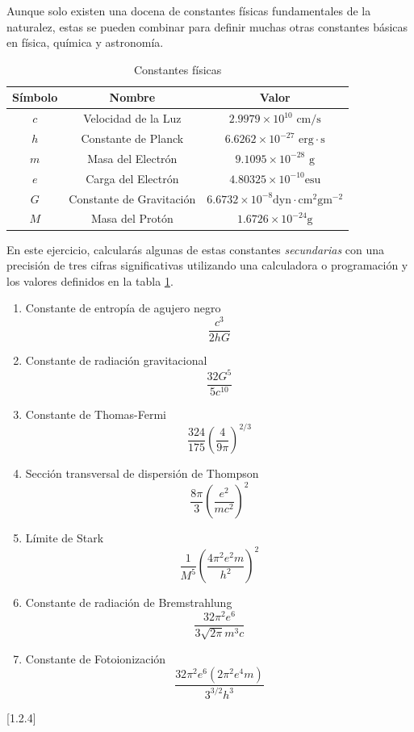 \documentclass[a4paper]{article}
\newcounter{problema}
\begin{document}
\begin{problema}
    Aunque solo existen una docena de constantes físicas fundamentales de la naturalez,
    estas se pueden combinar para definir muchas otras constantes básicas en física, 
    química y astronomía.

    \begin{table}[H]
    \centering
    \begin{tabular}{|c|c|c|}
    \hline
    Símbolo & Nombre & Valor \\
    \hline
    $c$ & Velocidad de la Luz & $2.9979\times 10^{10} \text{ cm/s}$\\
    \hline
    $h$ & Constante de Planck & $6.6262\times 10^{-27} \text{ erg}\cdot \text{s}$\\
    \hline
    $m$ & Masa del Electrón & $9.1095\times 10^{-28} \text{ g}$\\
    \hline
    $e$ & Carga del Electrón & $4.80325 \times 10^{-10} \text{esu}$\\
    \hline
    $G$ & Constante de Gravitación & $6.6732 \times 10^{-8} \text{dyn} \cdot \text{cm}^2 \text{gm}^{-2}$\\
    \hline
    $M$ & Masa del Protón & $1.6726 \times 10^{-24} \text{g}$\\
    \hline
    \end{tabular}
    \caption{Constantes físicas}
    \label{tab:1}
    \end{table}
    En este ejercicio, calcularás algunas de estas constantes \textit{secundarias} con una precisión 
    de tres cifras significativas utilizando una calculadora o programación y los valores definidos 
    en la tabla \ref{tab:1}.

    \begin{enumerate}
        \item Constante de entropía de agujero negro $$\frac{c^3}{2hG}$$
        \item Constante de radiación gravitacional $$\frac{32 G^5}{5 c^{10}}$$
        \item Constante de Thomas-Fermi $$\frac{324}{175} \left(\frac{4}{9\pi}\right)^{2/3}$$
        \item Sección transversal de dispersión de Thompson $$\frac{8 \pi}{3} \left(\frac{e^2}{mc^2}\right)^2$$
        \item Límite de Stark $$\frac{1}{M^5} \left(\frac{4 \pi^2 e^2 m}{h^2}\right)^2$$
        \item Constante de radiación de Bremstrahlung $$\frac{32 \pi^2 e^6}{3\sqrt{2\pi}m^3c}$$
        \item Constante de Fotoionización $$\frac{32 \pi^2 e^6 (2\pi^2 e^4 m)}{3^{3/2} h^3}$$
    \end{enumerate}
\end{problema} [1.2.4]
\end{document}
